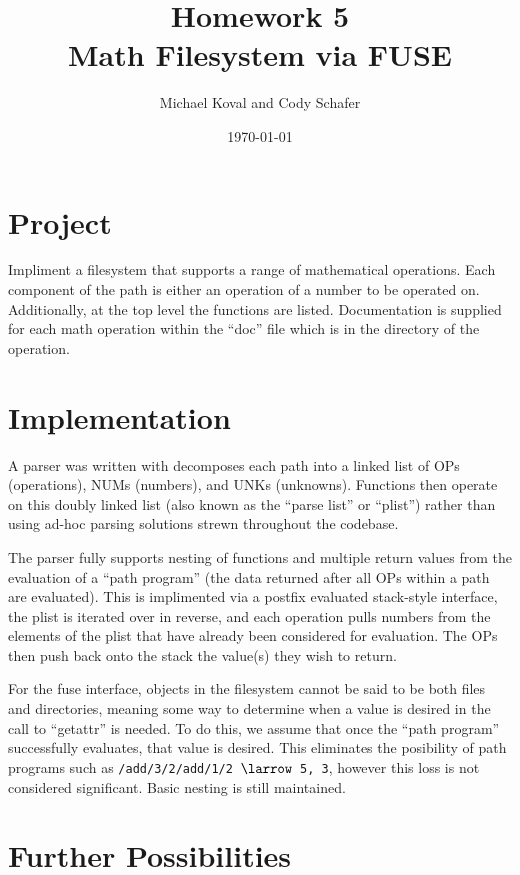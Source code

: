 \documentclass[10pt]{article}
\title{\textbf{Homework 5}\\
Math Filesystem via FUSE}
\author{Michael Koval and Cody Schafer}
\date{\today}
\begin{document}
\maketitle

\section{Project}

Impliment a filesystem that supports a range of mathematical operations.
Each component of the path is either an operation of a number to be
operated on. Additionally, at the top level the functions are listed.
Documentation is supplied for each math operation within the ``doc'' file
which is in the directory of the operation.

\section{Implementation}

A parser was written with decomposes each path into a linked list of OPs
(operations), NUMs (numbers), and UNKs (unknowns). Functions then operate
on this doubly linked list (also known as the ``parse list'' or ``plist'')
rather than using ad-hoc parsing solutions strewn throughout the codebase.

The parser fully supports nesting of functions and multiple return values
from the evaluation of a ``path program'' (the data returned after all
OPs within a path are evaluated). This is implimented via a postfix
evaluated stack-style interface, the plist is iterated over in reverse,
and each operation pulls numbers from the elements of the plist that have
already been considered for evaluation. The OPs then push back onto the
stack the value(s) they wish to return.

For the fuse interface, objects in the filesystem cannot be said to be
both files and directories, meaning some way to determine when a value is
desired in the call to ``getattr'' is needed. To do this, we assume that
once the ``path program'' successfully evaluates, that value is desired.
This eliminates the posibility of path programs such as
\texttt{/add/3/2/add/1/2 $\larrow$ 5, 3}, however this loss is not
considered significant. Basic nesting is still maintained.




\section{Further Possibilities}
\end{document}
